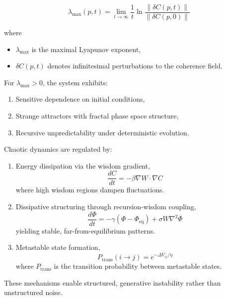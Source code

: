 \begin{equation}
\lambda_{\text{max}}(p,t) = \lim_{t \to \infty} \frac{1}{t} \ln \frac{\|\delta C(p,t)\|}{\|\delta C(p,0)\|}
\end{equation}

where

\begin{itemize}
    \item \(\lambda_{\text{max}}\) is the maximal Lyapunov exponent,
    \item \(\delta C(p,t)\) denotes infinitesimal perturbations to the coherence field.
\end{itemize}

For \(\lambda_{\text{max}} > 0\), the system exhibits:

\begin{enumerate}
    \item Sensitive dependence on initial conditions,
    \item Strange attractors with fractal phase space structure,
    \item Recursive unpredictability under deterministic evolution.
\end{enumerate}

Chaotic dynamics are regulated by:

\begin{enumerate}
    \item Energy dissipation via the wisdom gradient,
    \begin{equation}
    \frac{dC}{dt} = -\beta \nabla W \cdot \nabla C
    \end{equation}
    where high wisdom regions dampen fluctuations.
    \item Dissipative structuring through recursion-wisdom coupling,
    \begin{equation}
    \frac{d\Phi}{dt} = -\gamma(\Phi - \Phi_{\text{eq}}) + \sigma W \nabla^2 \Phi
    \end{equation}
    yielding stable, far-from-equilibrium patterns.
    \item Metastable state formation,
    \begin{equation}
    P_{\text{trans}}(i \to j) = e^{-\Delta V_{ij}/\eta}
    \end{equation}
    where \(P_{\text{trans}}\) is the transition probability between metastable states.
\end{enumerate}

These mechanisms enable structured, generative instability rather than unstructured noise.

